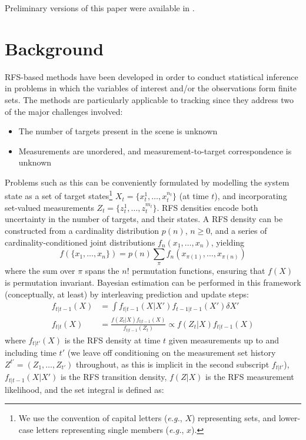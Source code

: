\documentclass[journal,twoside]{IEEEtran}
\theoremstyle{plain}
\begin{document}
Preliminary versions of this paper were available in \cite{Wil11b,Wil11c,Wil14c}. 


\section{Background}
\label{sec:Background}
%
RFS-based methods \cite{Mah07} have been developed in order to conduct statistical inference in problems in which the variables of interest and/or the observations form finite sets. The methods are particularly applicable to tracking since they address two of the major challenges involved:
%
\begin{itemize}
\item The number of targets present in the scene is unknown
\item Measurements are unordered, and measurement-to-target correspondence is unknown
\end{itemize} 
%
Problems such as this can be conveniently formulated by modelling the system state as a set of target states\footnote{We use the convention of capital letters (\textit{e.g.}\xspace, $X$) representing sets, and lower-case letters representing single members (\textit{e.g.}\xspace, $x$).} $X_t = \{x_t^1,\dots,x_t^{n_t}\}$ (at time $t$), and incorporating set-valued measurements $Z_t = \{z_t^1,\dots,z_t^{m_t}\}$. RFS densities encode both uncertainty in the number of targets, and their states. A RFS density can be constructed from a cardinality distribution $p(n)$, $n\geq 0$, and a series of cardinality-conditioned joint distributions $f_n(x_1,\dots,x_n)$, yielding
%
\begin{equation}
f(\{x_1,\dots,x_n\}) = p(n) \sum_{\pi} f_n(x_{\pi(1)},\dots,x_{\pi(n)})
\end{equation}
%
where the sum over $\pi$ spans the $n!$ permutation functions, ensuring that $f(X)$ is permutation invariant. Bayesian estimation can be performed in this framework (conceptually, at least) by interleaving prediction and update steps: \cite[p484]{Mah07}
%
\begin{align}
f_{t|t-1}(X) &= \int{f_{t|t-1}(X|X')f_{t-1|t-1}(X')\delta X'} \label{eq:RFSPrediction} \\
f_{t|t}(X) &= \frac{f(Z_t|X) f_{t|t-1}(X)}{f_{t|t-1}(Z_t)} \propto f(Z_t|X) f_{t|t-1}(X) \label{eq:RFSUpdate}
\end{align}
%
where $f_{t|t'}(X)$ is the RFS density at time $t$ given measurements up to and including time $t'$ (we leave off conditioning on the measurement set history $Z^{t'}=(Z_1,\dots,Z_{t'})$ throughout, as this is implicit in the second subscript $f_{t|t'}$), $f_{t|t-1}(X|X')$ is the RFS transition density, $f(Z|X)$ is the RFS measurement likelihood, and the set integral is defined as: \cite[p361]{Mah07}
\end{document}
